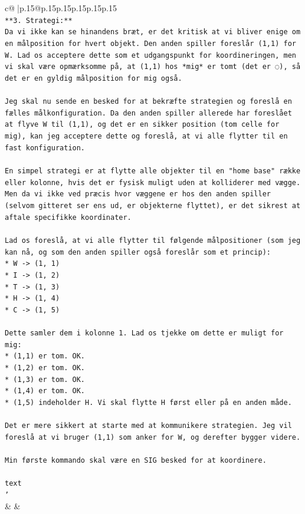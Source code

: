 \documentclass{article}
\begin{document}
{\begin{supertabular}{c@{$\;$}|p{.15\linewidth}@{}p{.15\linewidth}p{.15\linewidth}p{.15\linewidth}p{.15\linewidth}p{.15\linewidth}}
{{{\\ 
\texttt{**3. Strategi:**} \\
\texttt{Da vi ikke kan se hinandens bræt, er det kritisk at vi bliver enige om en målposition for hvert objekt. Den anden spiller foreslår (1,1) for W. Lad os acceptere dette som et udgangspunkt for koordineringen, men vi skal være opmærksomme på, at (1,1) hos *mig* er tomt (det er ◌), så det er en gyldig målposition for mig også.} \\
\\ 
\texttt{Jeg skal nu sende en besked for at bekræfte strategien og foreslå en fælles målkonfiguration. Da den anden spiller allerede har foreslået at flyve W til (1,1), og det er en sikker position (tom celle for mig), kan jeg acceptere dette og foreslå, at vi alle flytter til en fast konfiguration.} \\
\\ 
\texttt{En simpel strategi er at flytte alle objekter til en "home base" række eller kolonne, hvis det er fysisk muligt uden at kolliderer med vægge. Men da vi ikke ved præcis hvor væggene er hos den anden spiller (selvom gitteret ser ens ud, er objekterne flyttet), er det sikrest at aftale specifikke koordinater.} \\
\\ 
\texttt{Lad os foreslå, at vi alle flytter til følgende målpositioner (som jeg kan nå, og som den anden spiller også foreslår som et princip):} \\
\texttt{*   W {-}> (1, 1)} \\
\texttt{*   I {-}> (1, 2)} \\
\texttt{*   T {-}> (1, 3)} \\
\texttt{*   H {-}> (1, 4)} \\
\texttt{*   C {-}> (1, 5)} \\
\\ 
\texttt{Dette samler dem i kolonne 1. Lad os tjekke om dette er muligt for mig:} \\
\texttt{*   (1,1) er tom. OK.} \\
\texttt{*   (1,2) er tom. OK.} \\
\texttt{*   (1,3) er tom. OK.} \\
\texttt{*   (1,4) er tom. OK.} \\
\texttt{*   (1,5) indeholder H. Vi skal flytte H først eller på en anden måde.} \\
\\ 
\texttt{Det er mere sikkert at starte med at kommunikere strategien. Jeg vil foreslå at vi bruger (1,1) som anker for W, og derefter bygger videre.} \\
\\ 
\texttt{Min første kommando skal være en SIG besked for at koordinere.} \\
\\ 
\texttt{text} \\
\texttt{'} \\
            }
        }
    }
    & & \\ \\


\end{supertabular}}
\end{document}

